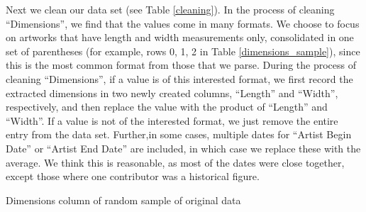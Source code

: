 \documentclass[12pt]{article}
\theoremstyle{definition}
\begin{document}
\par Next we clean our data set (see Table \ref{cleaning}). In the process of cleaning ``Dimensions'', we find that the values come in many formats. We choose to focus on artworks that have length and width measurements only, consolidated in one set of parentheses (for example, rows 0, 1, 2 in Table \ref{dimensions_sample}), since this is the most common format from those that we parse. During the process of cleaning ``Dimensions'', if a value is of this interested format, we first record the extracted dimensions in two newly created columns, ``Length'' and ``Width'', respectively, and then replace the value with the product of ``Length'' and ``Width''. If a value is not of the interested format, we just remove the entire entry from the data set. Further,in some cases, multiple dates for ``Artist Begin Date'' or ``Artist End Date'' are included, in which case we replace these with the average. We think this is reasonable, as most of the dates were close together, except those where one contributor was a historical figure.\\
\begin{table}

\caption{Dimensions column of random sample of original data}
\label{dimensions_sample}
\end{table}
\end{document}
